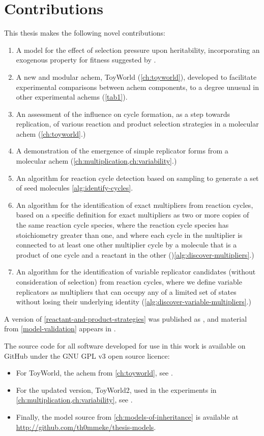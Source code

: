 \section{Contributions}\label{contributions}

This thesis makes the following novel contributions:

\begin{enumerate}
\item A model for the effect of selection pressure upon heritability, incorporating an exogenous property for fitness suggested by \textcite{Bourrat2015}.
\item A new and modular \gls{achem}, ToyWorld (\cref{ch:toyworld}), developed to facilitate experimental comparisons between \gls{achem} components, to a degree unusual in other experimental \glspl{achem} (\eg \cref{tab1}).
\item An assessment of the influence on cycle formation, as a step towards replication, of various reaction and product selection strategies in a molecular \gls{achem} (\cref{ch:toyworld}.)
\item A demonstration of the emergence of simple replicator forms from a molecular \gls{achem} (\cref{ch:multiplication,ch:variability}.)
\item An algorithm for reaction cycle detection based on sampling to generate a set of seed molecules \cref{alg:identify-cycles}.
\item An algorithm for the identification of exact multipliers from reaction cycles, based on a specific definition for exact multipliers as two or more copies of the same reaction cycle species, where the reaction cycle species has stoichiometry greater than one, and where each cycle in the multiplier is connected to at least one other multiplier cycle by a molecule that is a product of one cycle and a reactant in the other ()\cref{alg:discover-multipliers}.)
\item An algorithm for the identification of variable replicator candidates (without consideration of selection) from reaction cycles, where we define variable replicators as multipliers that can occupy any of a limited set of states without losing their underlying identity (\cref{alg:discover-variable-multipliers}.)
\end{enumerate}

A version of \cref{reactant-and-product-strategies} was published as \textcite{Young2015}, and material from \cref{model-validation} appears in \textcite{Young2013}.

The source code for all software developed for use in this work is available on GitHub under the GNU GPL v3 open source licence:
\begin{itemize}
	\item For ToyWorld, the \gls{achem} from \cref{ch:toyworld}, see \cite{toyworld}.
	\item For the updated version, ToyWorld2, used in the experiments in \cref{ch:multiplication,ch:variability}, see \cite{toyworld2}.
	\item Finally, the model source from \cref{ch:models-of-inheritance} is available at \url{http://github.com/th0mmeke/thesis-models}. 
\end{itemize}




